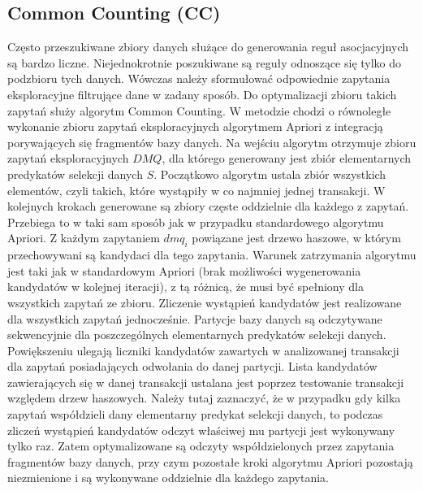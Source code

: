 \subsection{Common Counting (CC) \cite{WojciechowskiCC}}
\label{c325}
Często przeszukiwane zbiory danych służące do generowania reguł asocjacyjnych są bardzo liczne. Niejednokrotnie poszukiwane są reguły odnoszące się tylko do podzbioru tych danych. Wówczas należy sformułować odpowiednie zapytania eksploracyjne filtrujące dane w zadany sposób. Do optymalizacji zbioru takich zapytań służy algorytm Common Counting. W metodzie chodzi o równoległe wykonanie zbioru zapytań eksploracyjnych algorytmem Apriori z integracją porywających się fragmentów bazy danych. Na wejściu algorytm otrzymuje zbioru zapytań eksploracyjnych \(DMQ\), dla którego generowany jest zbiór elementarnych predykatów selekcji danych \(S\). Początkowo algorytm ustala zbiór wszystkich elementów, czyli takich, które wystąpiły w co najmniej jednej transakcji. W kolejnych krokach generowane są zbiory częste oddzielnie dla każdego z zapytań. Przebiega to w taki sam sposób jak w przypadku standardowego algorytmu Apriori. Z każdym zapytaniem \(dmq_i\) powiązane jest drzewo haszowe, w którym przechowywani są kandydaci dla tego zapytania. Warunek zatrzymania algorytmu jest taki jak w standardowym Apriori (brak możliwości wygenerowania kandydatów w kolejnej iteracji), z tą różnicą, że musi być spełniony dla wszystkich zapytań ze zbioru. 
Zliczenie wystąpień kandydatów jest realizowane dla wszystkich zapytań jednocześnie. Partycje bazy danych są odczytywane sekwencyjnie dla poszczególnych elementarnych predykatów selekcji danych. Powiększeniu ulegają liczniki kandydatów zawartych w analizowanej transakcji dla zapytań posiadających odwołania do danej partycji. Lista kandydatów zawierających się w danej transakcji ustalana jest poprzez testowanie transakcji względem drzew haszowych. Należy tutaj zaznaczyć, że w przypadku gdy kilka zapytań współdzieli dany elementarny predykat selekcji danych, to podczas zliczeń wystąpień kandydatów odczyt właściwej mu partycji jest wykonywany tylko raz. Zatem optymalizowane są odczyty współdzielonych przez zapytania fragmentów bazy danych, przy czym pozostałe kroki algorytmu Apriori pozostają niezmienione i są wykonywane oddzielnie dla każdego zapytania. 

